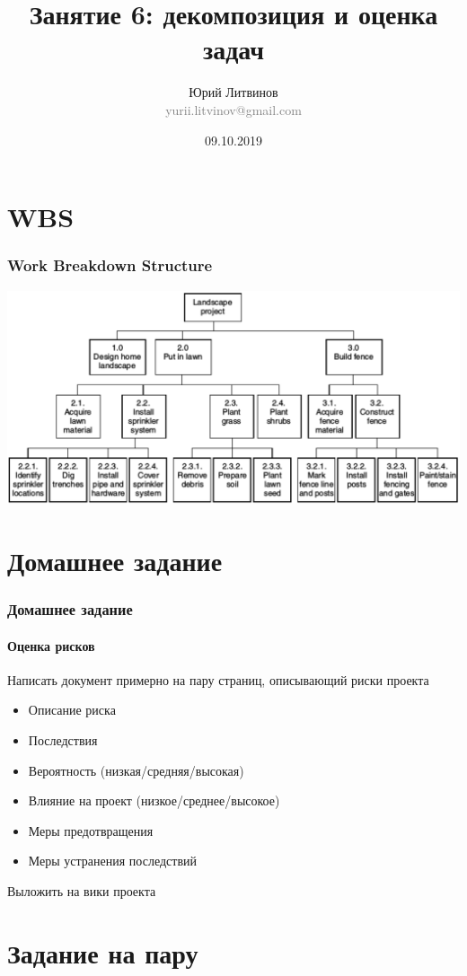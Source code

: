\documentclass[xetex,mathserif,serif]{beamer}
\title{Занятие 6: декомпозиция и оценка задач}
\author[Юрий Литвинов]{Юрий Литвинов\\\small{\textcolor{gray}{yurii.litvinov@gmail.com}}}
\date{09.10.2019}
\begin{document}
	\frame{\titlepage}

	\section{WBS}

	\begin{frame}
		\frametitle{Work Breakdown Structure}
		\begin{center}
			\includegraphics[width=\textwidth]{wbs.png}
		\end{center}
	\end{frame}

	\section{Домашнее задание}
	
	\begin{frame}
		\frametitle{Домашнее задание}
		\framesubtitle{Оценка рисков}
		Написать документ примерно на пару страниц, описывающий риски проекта
		\begin{itemize}
			\item Описание риска
			\item Последствия
			\item Вероятность (низкая/средняя/высокая)
			\item Влияние на проект (низкое/среднее/высокое)
			\item Меры предотвращения
			\item Меры устранения последствий
		\end{itemize}
		Выложить на вики проекта
	\end{frame}

	\section{Задание на пару}
\end{document}
